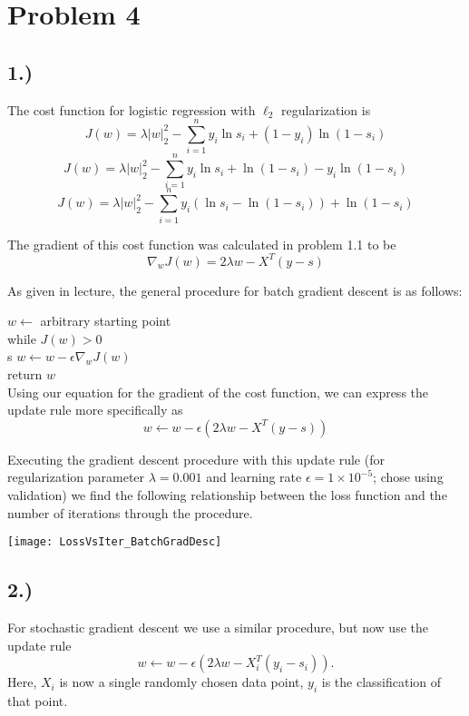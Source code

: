 \documentclass{report}
\newcommand{\tab}{\-\hspace{1.5cm}}
\begin{document}
\section*{Problem 4}

\subsection*{1.)}

The cost function for logistic regression with $\ell_2$ regularization is
$$ J(w) = \lambda |w|_2^2 - \sum_{i=1}^n{ y_i \ln s_i + (1-y_i) \ln (1-s_i)} $$
$$ J(w) = \lambda |w|_2^2 - \sum_{i=1}^n{ y_i \ln s_i + \ln (1-s_i) - y_i \ln (1-s_i)} $$
$$ J(w) = \lambda |w|_2^2 - \sum_{i=1}^n{ y_i(\ln s_i - \ln (1-s_i)) + \ln (1-s_i) } $$

The gradient of this cost function was calculated in problem 1.1 to be
$$ \nabla_w J(w) = 2 \lambda w - X^T(y-s) $$

As given in lecture, the general procedure for batch gradient descent is as follows:

\tab $w \leftarrow$ arbitrary starting point \\
\tab while $J(w) > 0 $ \\s
\tab \tab $w \leftarrow w - \epsilon \nabla_w J(w)$ \\
\tab return $w$ \\

Using our equation for the gradient of the cost function, we can express the update rule more specifically as
$$ w \leftarrow w - \epsilon(2 \lambda w - X^T(y-s)) $$

Executing the gradient descent procedure with this update rule (for regularization parameter $\lambda = 0.001$ and learning rate $\epsilon = 1\times10^{-5}$; chose using validation) we find the following relationship between the loss function and the number of iterations through the procedure.\\
\begin{center}
\texttt{[image: LossVsIter\_BatchGradDesc]}
\end{center}

\subsection*{2.)}

For stochastic gradient descent we use a similar procedure, but now use the update rule 
$$ w \leftarrow w - \epsilon(2 \lambda w - X_i^T(y_i-s_i)). $$
Here, $X_i$ is now a single randomly chosen data point, $y_i$ is the classification of that point.
\end{document}
